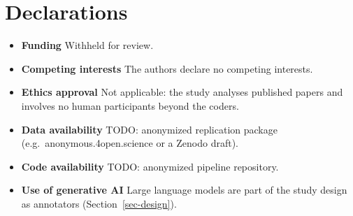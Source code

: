 
\section*{Declarations}

\begin{itemize}
\item \textbf{Funding} Withheld for review.
\item \textbf{Competing interests} The authors declare no competing interests. %
\item \textbf{Ethics approval} Not applicable: the study analyses published papers and involves no human participants beyond the coders.
\item \textbf{Data availability} TODO: anonymized replication package (e.g.\ anonymous.4open.science or a Zenodo draft).
\item \textbf{Code availability} TODO: anonymized pipeline repository.
\item \textbf{Use of generative AI} Large language models are part of the study design as annotators (Section~\ref{sec-design}).
\end{itemize}

